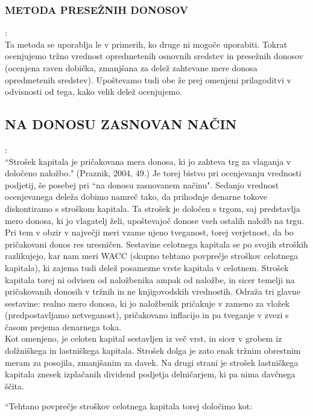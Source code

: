 \documentclass[12pt,a4paper]{amsart}
\theoremstyle{definition} %
\theoremstyle{plain} %
\begin{document}
\subsubsection{METODA PRESEŽNIH DONOSOV}:\\

Ta metoda se uporablja le v primerih, ko druge ni mogoče uporabiti. Tokrat ocenjujemo tržno vrednost opredmetenih osnovnih sredstev in presežnih donosov (ocenjena raven dobička, zmanjšana za delež zahtevane mere donosa opredmetenih sredstev). Upoštevamo tudi obe že prej omenjeni prilagoditvi v odvisnosti od tega, kako velik delež ocenjujemo. 


\subsection{NA DONOSU ZASNOVAN NAČIN}:\\

``Strošek kapitala je pričakovana mera donosa, ki jo zahteva trg za vlaganja v določeno naložbo." (Praznik, 2004, 49.) Je torej bistvo pri ocenjevanju vrednosti podjetij,  še posebej pri ``na donosu zasnovanem načinu". Sedanjo vrednost ocenjevanega deleža dobimo namreč tako, da prihodnje denarne tokove diskontiramo s stroškom kapitala. Ta strošek je določen s trgom, saj predstavlja mero donosa, ki jo vlagatelj želi, upoštevajoč donose vseh ostalih naložb na trgu. Pri tem v obzir v največji meri vzame njeno tveganost, torej verjetnost, da bo pričakovani donos res uresničen. Sestavine celotnega kapitala se po svojih stroških razlikujejo, kar nam meri WACC (skupno tehtano povprečje stroškov celotnega kapitala), ki zajema tudi delež posamezne vrste kapitala v celotnem. Strošek kapitala torej ni odvisen od naložbenika ampak od naložbe, in sicer temelji na pričakovanih donosih v tržnih in ne knjigovodskih vrednostih. Odraža tri glavne sestavine: realno mero donosa, ki jo naložbenik pričakuje v zameno za vložek (predpostavljamo netveganost), pričakovano inflacijo in pa tveganje v zvezi s časom prejema denarnega toka.\\
Kot omenjeno, je celoten kapital sestavljen iz več vrst, in sicer v grobem iz dolžniškega in lastniškega kapitala. Strošek dolga je zato enak tržnim obrestnim meram za posojila, zmanjšanim za davek. Na drugi strani je strošek lastniškega kapitala znesek izplačanih dividend podjetja delničarjem, ki pa nima davčnega ščita.\par
``Tehtano povprečje stroškov celotnega kapitala torej določimo kot:
\end{document}
